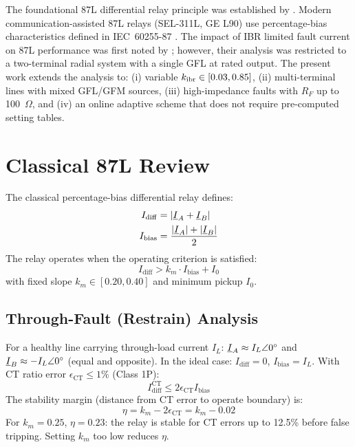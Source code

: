 The foundational 87L differential relay principle was established by
\citet{Westinghouse1962}. Modern communication-assisted 87L relays
(SEL-311L, GE L90) use percentage-bias characteristics defined in
IEC~60255-87 \citep{IEC60255}. The impact of IBR limited fault current on
87L performance was first noted by \citet{Hooshyar2019}; however, their
analysis was restricted to a two-terminal radial system with a single GFL
at rated output. The present work extends the analysis to:
(i) variable $k_{\mathrm{ibr}} \in [0.03, 0.85]$,
(ii) multi-terminal lines with mixed GFL/GFM sources,
(iii) high-impedance faults with $R_F$ up to 100~$\Omega$, and
(iv) an online adaptive scheme that does not require pre-computed setting
tables.

\section{Classical 87L Review}
\label{sec:ch4_review}

The classical percentage-bias differential relay defines:
\begin{align}
  I_\mathrm{diff} &= |\underline{I}_A + \underline{I}_B|
  \label{eq:ch4_idiff_def} \\
  I_\mathrm{bias} &= \frac{|\underline{I}_A| + |\underline{I}_B|}{2}
  \label{eq:ch4_ibias_def}
\end{align}
The relay operates when the operating criterion is satisfied:
\begin{equation}
  \boxed{I_\mathrm{diff} > k_m \cdot I_\mathrm{bias} + I_0}
  \label{eq:ch4_87l_criterion}
\end{equation}
with fixed slope $k_m \in [0.20, 0.40]$ and minimum pickup $I_0$.

\subsection{Through-Fault (Restrain) Analysis}

For a healthy line carrying through-load current $I_L$:
$\underline{I}_A \approx I_L\angle 0^\circ$ and $\underline{I}_B \approx -I_L\angle 0^\circ$
(equal and opposite). In the ideal case:
$I_\mathrm{diff} = 0$, $I_\mathrm{bias} = I_L$.
With CT ratio error $\epsilon_\mathrm{CT} \leq 1\%$ (Class 1P):
\begin{equation}
  I_\mathrm{diff}^\mathrm{CT} \leq 2\epsilon_\mathrm{CT} I_\mathrm{bias}
  \label{eq:ch4_ct_error}
\end{equation}
The stability margin (distance from CT error to operate boundary) is:
\begin{equation}
  \eta = k_m - 2\epsilon_\mathrm{CT} = k_m - 0.02
  \label{eq:ch4_stability_margin}
\end{equation}
For $k_m = 0.25$, $\eta = 0.23$: the relay is stable for CT errors up to
12.5\% before false tripping. Setting $k_m$ too low reduces $\eta$.

